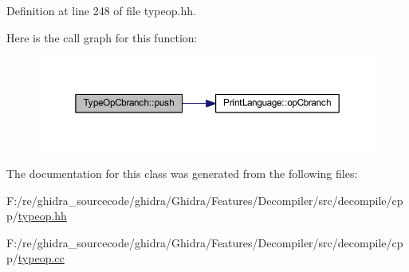 Definition at line 248 of file typeop.\+hh.

Here is the call graph for this function\+:
\nopagebreak
\begin{figure}[H]
\begin{center}
\leavevmode
\includegraphics[width=350pt]{class_type_op_cbranch_a5798175bf1004bd4af848b14e6e0b46c_cgraph}
\end{center}
\end{figure}


The documentation for this class was generated from the following files\+:\begin{DoxyCompactItemize}
\item 
F\+:/re/ghidra\+\_\+sourcecode/ghidra/\+Ghidra/\+Features/\+Decompiler/src/decompile/cpp/\mbox{\hyperlink{typeop_8hh}{typeop.\+hh}}\item 
F\+:/re/ghidra\+\_\+sourcecode/ghidra/\+Ghidra/\+Features/\+Decompiler/src/decompile/cpp/\mbox{\hyperlink{typeop_8cc}{typeop.\+cc}}\end{DoxyCompactItemize}
